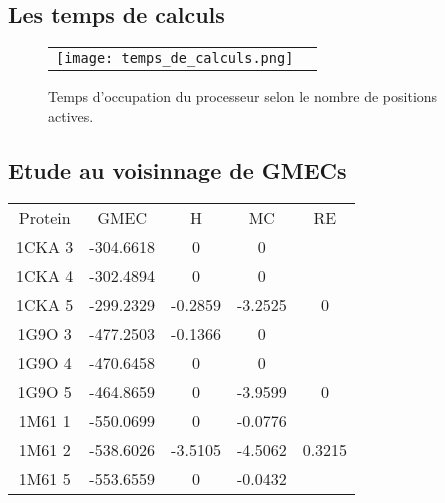     \subsection{Les temps de calculs} 
    
    \begin{figure}[h]
      \centering
      \begin{tabular}{cc}
        \texttt{[image: temps\_de\_calculs.png]} &
      \end{tabular}
      
      \caption{Temps d'occupation du processeur selon le nombre de positions actives.}
\label{graph:temps_CPU}
    \end{figure}


   \subsection{Etude au voisinnage de GMECs}


    \begin{table}[h]
      \centering

      \begin{tabular}{ccccc}


        \toprule
        Protein & GMEC & H & MC & RE \\
        \cmidrule{1-5}
        1CKA 3 & -304.6618 & 0 & 0 & \\
        1CKA 4 & -302.4894 & 0 & 0 & \\
        1CKA 5 & -299.2329 & -0.2859 & -3.2525 & 0 \\
        1G9O 3 & -477.2503 & -0.1366 & 0 & \\
        1G9O 4 & -470.6458 & 0 & 0 & \\
        1G9O 5 & -464.8659 & 0 & -3.9599 &  0 \\
        1M61 1 & -550.0699 & 0 & -0.0776 & \\
        1M61 2 & -538.6026 & -3.5105 & -4.5062 & 0.3215 \\
        1M61 5 & -553.6559 & 0 & -0.0432 & \\
        \bottomrule       
      \end{tabular}      
\label{tab:voisinnage_rappel}      
    \end{table}


